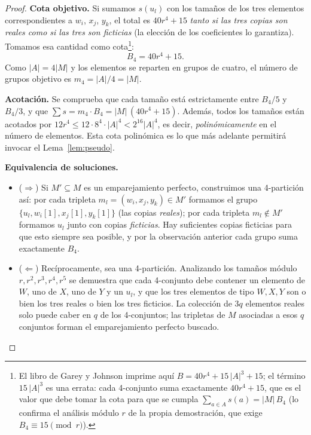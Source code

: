 \documentclass[12pt,a4paper]{article}
\theoremstyle{definition}
\theoremstyle{remark}
\begin{document}
\begin{proof}
\medskip
\noindent\textbf{Cota objetivo.}
Si sumamos $s(u_l)$ con los tamaños de los tres elementos correspondientes a
$w_i$, $x_j$, $y_k$, el total es $40r^4 + 15$ \emph{tanto si las tres copias son
reales como si las tres son ficticias} (la elección de los coeficientes lo
garantiza). Tomamos esa cantidad como cota\footnote{El libro de Garey y Johnson
imprime aquí $B = 40r^4 + 15\,|A|^3 + 15$; el término $15\,|A|^3$ es una errata:
cada 4-conjunto suma exactamente $40r^4 + 15$, que es el valor que debe tomar la
cota para que se cumpla $\sum_{a\in A} s(a) = |M|\,B_4$ (lo confirma el análisis
módulo $r$ de la propia demostración, que exige $B_4 \equiv 15 \pmod r$).}:
\[
  B_4 = 40r^4 + 15.
\]
Como $|A| = 4|M|$ y los elementos se reparten en grupos de cuatro, el número de
grupos objetivo es $m_4 = |A|/4 = |M|$.

\medskip
\noindent\textbf{Acotación.}
Se comprueba que cada tamaño está estrictamente entre $B_4/5$ y $B_4/3$, y que
$\sum s = m_4 \cdot B_4 = |M|\,(40r^4 + 15)$. Además, todos los tamaños están
acotados por
$12r^4 \leq 12 \cdot 8^4 \cdot |A|^4 < 2^{16} |A|^4$, es decir, \emph{polinómicamente}
en el número de elementos. Esta cota polinómica es lo que más adelante permitirá
invocar el Lema~\ref{lem:pseudo}.

\medskip
\noindent\textbf{Equivalencia de soluciones.}
\begin{itemize}
  \item ($\Rightarrow$) Si $M' \subseteq M$ es un emparejamiento perfecto,
        construimos una 4-partición así: por cada tripleta
        $m_l = (w_i,x_j,y_k) \in M'$ formamos el grupo
        $\{u_l, w_i[1], x_j[1], y_k[1]\}$ (las copias \emph{reales}); por cada
        tripleta $m_l \notin M'$ formamos $u_l$ junto con copias \emph{ficticias}.
        Hay suficientes copias ficticias para que esto siempre sea posible, y por
        la observación anterior cada grupo suma exactamente $B_4$.
  \item ($\Leftarrow$) Recíprocamente, sea una 4-partición. Analizando los tamaños
        módulo $r, r^2, r^3, r^4, r^5$ se demuestra que cada 4-conjunto debe
        contener un elemento de $W$, uno de $X$, uno de $Y$ y un $u_l$, y que los
        tres elementos de tipo $W,X,Y$ son o bien los tres reales o bien los tres
        ficticios. La colección de $3q$ elementos reales solo puede caber en $q$ de
        los 4-conjuntos; las tripletas de $M$ asociadas a esos $q$ conjuntos forman
        el emparejamiento perfecto buscado.
\end{itemize}


\end{proof}
\end{document}
